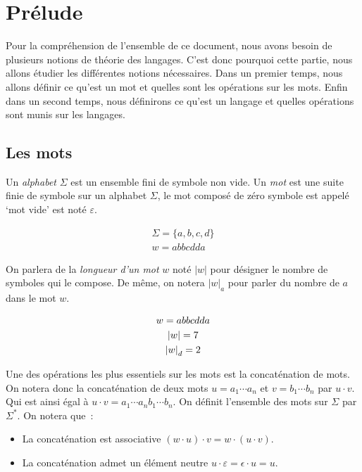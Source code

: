 \section{Prélude}

Pour la compréhension de l'ensemble de ce document, nous avons besoin de
plusieurs notions de théorie des langages. C'est donc pourquoi cette partie,
nous allons étudier les différentes notions nécessaires. Dans un premier temps,
nous allons définir ce qu'est un mot et quelles sont les opérations sur les
mots. Enfin dans un second temps, nous définirons ce qu'est un langage et
quelles opérations sont munis sur les langages.

\subsection{Les mots}

Un \textit{alphabet} \(\Sigma\) est un ensemble fini de symbole non vide. Un
\textit{mot} est une suite finie de symbole sur un alphabet \(\Sigma\), le mot
composé de zéro symbole est appelé `mot vide' est noté \(\varepsilon\).

\begin{example}
    \begin{gather}
        \Sigma = \{a, b, c, d\} \\
        w = abbcdda
    \end{gather}
\end{example}

On parlera de la \textit{longueur d'un mot} \(w\) noté \(|w|\) pour désigner le
nombre de symboles qui le compose. De même, on notera \({|w|}_a\) pour parler
du nombre de \(a\) dans le mot \(w\).

\begin{example}
    \begin{gather}
        w = abbcdda \notag \\
        |w| = 7 \\
        {|w|}_d = 2
    \end{gather}
\end{example}

Une des opérations les plus essentiels sur les mots est la concaténation de
mots. On notera donc la concaténation de deux mots \(u = a_1 \cdots a_n\) et
\(v = b_1 \cdots b_n\) par \(u \cdot v\). Qui est ainsi égal à \(u \cdot v =
a_1 \cdots a_n b_1 \cdots b_n\). On définit l'ensemble des mots sur \(\Sigma\)
par \(\Sigma ^ *\). On notera que~:

\begin{itemize}[label=\textbullet]
    \item La concaténation est associative \((w \cdot u) \cdot v = w \cdot (u \cdot v)\).
    \item La concaténation admet un élément neutre \(u \cdot \varepsilon = \epsilon \cdot
          u = u\).
\end{itemize}

